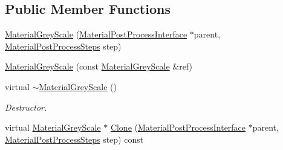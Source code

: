 \subsection*{Public Member Functions}
\begin{DoxyCompactItemize}
\item 
\mbox{\hyperlink{class_geometry_engine_1_1_custom_shading_1_1_material_grey_scale_af34c70eefcc14f4dc9a91f98eb60184b}{Material\+Grey\+Scale}} (\mbox{\hyperlink{class_geometry_engine_1_1_custom_shading_1_1_material_post_process_interface}{Material\+Post\+Process\+Interface}} $\ast$parent, \mbox{\hyperlink{namespace_geometry_engine_1_1_custom_shading_af8b09b91ca7086f4f67a5d4181f35e58}{Material\+Post\+Process\+Steps}} step)
\item 
\mbox{\hyperlink{class_geometry_engine_1_1_custom_shading_1_1_material_grey_scale_abab5bea6ddcb2ad41aea9860f6b5c9d2}{Material\+Grey\+Scale}} (const \mbox{\hyperlink{class_geometry_engine_1_1_custom_shading_1_1_material_grey_scale}{Material\+Grey\+Scale}} \&ref)
\item 
\mbox{\label{class_geometry_engine_1_1_custom_shading_1_1_material_grey_scale_abd10728bb53336d3b0a9dab8651e6dbe}} 
virtual \mbox{\hyperlink{class_geometry_engine_1_1_custom_shading_1_1_material_grey_scale_abd10728bb53336d3b0a9dab8651e6dbe}{$\sim$\+Material\+Grey\+Scale}} ()
\begin{DoxyCompactList}\small\item\em Destructor. \end{DoxyCompactList}\item 
virtual \mbox{\hyperlink{class_geometry_engine_1_1_custom_shading_1_1_material_grey_scale}{Material\+Grey\+Scale}} $\ast$ \mbox{\hyperlink{class_geometry_engine_1_1_custom_shading_1_1_material_grey_scale_a41197b3565f2098a3b713b5de572f2ed}{Clone}} (\mbox{\hyperlink{class_geometry_engine_1_1_custom_shading_1_1_material_post_process_interface}{Material\+Post\+Process\+Interface}} $\ast$parent, \mbox{\hyperlink{namespace_geometry_engine_1_1_custom_shading_af8b09b91ca7086f4f67a5d4181f35e58}{Material\+Post\+Process\+Steps}} step) const
\end{DoxyCompactItemize}
